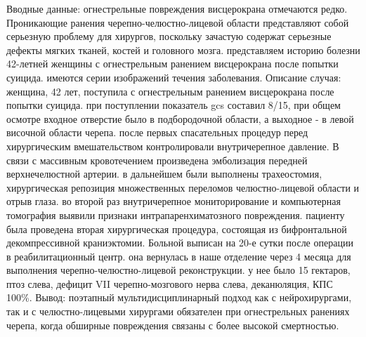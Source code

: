 Вводные данные: огнестрельные повреждения висцерокрана отмечаются редко.
Проникающие ранения черепно-челюстно-лицевой области представляют собой
серьезную проблему для хирургов, поскольку зачастую содержат серьезные дефекты
мягких тканей, костей и головного мозга. представляем историю болезни 42-летней
женщины с огнестрельным ранением висцерокрана после попытки суицида. имеются
серии изображений течения заболевания. Описание случая: женщина, 42 лет,
поступила с огнестрельным ранением висцерокрана после попытки суицида. при
поступлении показатель gcs составил 8/15, при общем осмотре входное отверстие
было в подбородочной области, а выходное - в левой височной области черепа.
после первых спасательных процедур перед хирургическим вмешательством
контролировали внутричерепное давление. В связи с массивным кровотечением
произведена эмболизация передней верхнечелюстной артерии. в дальнейшем были
выполнены трахеостомия, хирургическая репозиция множественных переломов
челюстно-лицевой области и отрыв глаза. во второй раз внутричерепное
мониторирование и компьютерная томография выявили признаки интрапаренхиматозного
повреждения. пациенту была проведена вторая хирургическая процедура, состоящая
из бифронтальной декомпрессивной краниэктомии. Больной выписан на 20-е сутки
после операции в реабилитационный центр. она вернулась в наше отделение через 4
месяца для выполнения черепно-челюстно-лицевой реконструкции. у нее было 15
гектаров, птоз слева, дефицит VII черепно-мозгового нерва слева, деканюляция,
КПС 100\%. Вывод: поэтапный мультидисциплинарный подход как с нейрохирургами, так
и с челюстно-лицевыми хирургами обязателен при огнестрельных ранениях черепа,
когда обширные повреждения связаны с более высокой смертностью.\cite{43295298}
